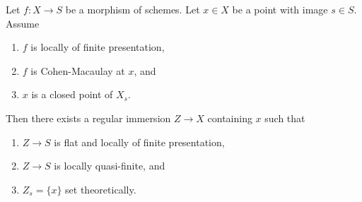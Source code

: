 \begin{lemma}
\label{lemma-slice-CM}
\begin{reference}
\cite[IV Proposition 17.16.1]{EGA}
\end{reference}
Let $f : X \to S$ be a morphism of schemes.
Let $x \in X$ be a point with image $s \in S$.
Assume
\begin{enumerate}
\item $f$ is locally of finite presentation,
\item $f$ is Cohen-Macaulay at $x$, and
\item $x$ is a closed point of $X_s$.
\end{enumerate}
Then there exists a regular immersion $Z \to X$ containing $x$ such that
\begin{enumerate}
\item[(a)] $Z \to S$ is flat and locally of finite presentation,
\item[(b)] $Z \to S$ is locally quasi-finite, and
\item[(c)] $Z_s = \{x\}$ set theoretically.
\end{enumerate}
\end{lemma}

